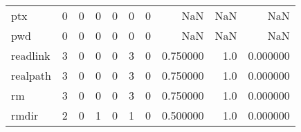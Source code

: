 \begin{longtable}{lrrrrrrrrr}
ptx       &                                       0 &                                                  0 &                                                  0 &                                                  0 &                                                  0 &                                                  0 &                                                NaN &                                    NaN &                                  NaN \\
pwd       &                                       0 &                                                  0 &                                                  0 &                                                  0 &                                                  0 &                                                  0 &                                                NaN &                                    NaN &                                  NaN \\
readlink  &                                       3 &                                                  0 &                                                  0 &                                                  0 &                                                  3 &                                                  0 &                                           0.750000 &                                    1.0 &                             0.000000 \\
realpath  &                                       3 &                                                  0 &                                                  0 &                                                  0 &                                                  3 &                                                  0 &                                           0.750000 &                                    1.0 &                             0.000000 \\
rm        &                                       3 &                                                  0 &                                                  0 &                                                  0 &                                                  3 &                                                  0 &                                           0.750000 &                                    1.0 &                             0.000000 \\
rmdir     &                                       2 &                                                  0 &                                                  1 &                                                  0 &                                                  1 &                                                  0 &                                           0.500000 &                                    1.0 &                             0.000000 \\

\end{longtable}
